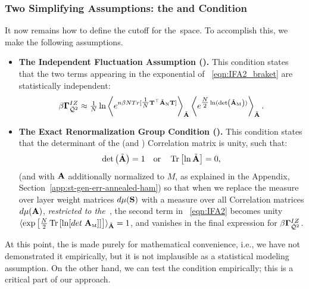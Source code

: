 \subsubsection{Two Simplifying Assumptions: the \IFA and \TRACELOG Condition}
\label{sxn:matgen_quality_hciz_C}

It now remains how to define the cutoff for the~\ECS space. To accomplish this, we make the following assumptions.
\begin{itemize}
\item
\textbf{The Independent Fluctuation Assumption (\IFA).}
This condition states that the two terms appearing in the exponential of \EQN~\ref{eqn:IFA2_braket} are statistically independent:
\begin{align}
  \label{eqn:IFA2}
  \beta\mathbf{\Gamma}^{IZ}_{\bar{\mathcal{Q}}^{2}} \approx 
    \tfrac{1}{N}
\ln
  \left\langle
  e^{n\beta N Tr[ \tfrac{1}{N}{\mathbf{T}}^{\top}\tilde{\mathbf{A}}_{\text{\tiny N}}{\mathbf{T}}] }
  \right\rangle_{\tilde{\mathbf{A}}}
  \left\langle
  e^{\tfrac{N}{2}\ln(\mbox{}{\text{det}}\left(\tilde{\mathbf{A}}_{\text{\tiny M}}\right))}
    \right\rangle_{\tilde{\mathbf{A}}}.
\end{align}
\item
\textbf{The Exact Renormalization Group Condition (\TRACELOG).}
This condition states that the determinant of the \Student (and \Teacher) Correlation matrix is unity, such that:
\begin{align}
\label{eqn:tlc_mm}
\mbox{}{\text{det}}\left(\tilde{\mathbf{A}}\right)=1 
\quad\mbox{or}\quad
\mbox{}\operatorname{Tr}\left[\ln \tilde{\mathbf{A}}\right]=0  ,
\end{align}
(and with $\mathbf{A}$ additionally normalized to $M$, as explained in the Appendix, Section~\ref{app:st-gen-err-annealed-ham})
so that when we replace the measure over \Student layer weight matrices $d\mu({\mathbf{S}})$ with a measure over all \Student Correlation matrices $d\mu(\mathbf{A})$,
\emph{restricted to the~\ECS}, the second term in \EQN~\ref{eqn:IFA2} becomes unity
$\langle \exp\left[\tfrac{N}{2} \mbox{}\operatorname{Tr}\left[ \ln[det\;{\mathbf{A}}_{\text{\tiny M}}] \right] \right]\rangle_{\tilde{\mathbf{A}}}=1$,
and vanishes in the final expression for $\beta\mathbf{\Gamma}^{IZ}_{\bar{\mathcal{Q}}^{2}}$.
\end{itemize}

\noindent
At this point, the \IFA is made purely for mathematical convenience, i.e., 
we have not demonstrated it empirically, but it is not implausible as a statistical modeling assumption. 
On the other hand, we can test the \TRACELOG condition empirically;
this is a critical part of our \SETOL approach.


